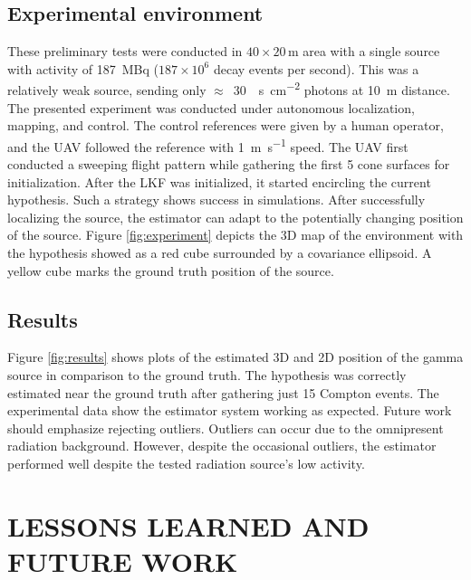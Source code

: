 \documentclass[a4paper,11pt,titlepage,twoside]{book}
\begin{document}
\subsection{Experimental environment}

These preliminary tests were conducted in $40 \times 20$\,\si{\meter} area with a single  source with activity of \SI{187}{\mega\becquerel} ($187 \times 10^{6}$ decay events per second).
This was a relatively weak source, sending only $\approx\,$ \SI{30}{\per\second\per\centi\meter\squared} photons at \SI{10}{\meter} distance.
The presented experiment was conducted under autonomous localization, mapping, and control.
The control references were given by a human operator, and the \ac{UAV} followed the reference with \SI{1}{\meter\per\second} speed.
The \ac{UAV} first conducted a sweeping flight pattern while gathering the first 5 cone surfaces for initialization.
After the \ac{LKF} was initialized, it started encircling the current hypothesis.
Such a strategy shows success in simulations.
After successfully localizing the source, the estimator can adapt to the potentially changing position of the source.
Figure \ref{fig:experiment} depicts the 3D map of the environment with the hypothesis showed as a red cube surrounded by a covariance ellipsoid.
A yellow cube marks the ground truth position of the source.

\subsection{Results}

Figure \ref{fig:results} shows plots of the estimated 3D and 2D position of the gamma source in comparison to the ground truth.
The hypothesis was correctly estimated near the ground truth after gathering just 15 Compton events.
The experimental data show the estimator system working as expected.
Future work should emphasize rejecting outliers.
Outliers can occur due to the omnipresent radiation background.
However, despite the occasional outliers, the estimator performed well despite the tested radiation source's low activity.



  \section{LESSONS LEARNED AND FUTURE WORK}
\end{document}
